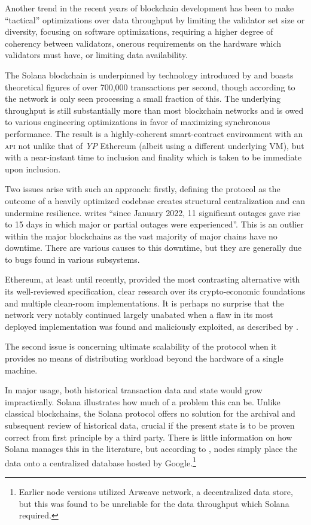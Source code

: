 Another trend in the recent years of blockchain development has been to make ``tactical'' optimizations over data throughput by limiting the validator set size or diversity, focusing on software optimizations, requiring a higher degree of coherency between validators, onerous requirements on the hardware which validators must have, or limiting data availability.

The Solana blockchain is underpinned by technology introduced by \cite{yakovenko2018solana} and boasts theoretical figures of over 700,000 transactions per second, though according to \cite{ng2024is} the network is only seen processing a small fraction of this. The underlying throughput is still substantially more than most blockchain networks and is owed to various engineering optimizations in favor of maximizing synchronous performance. The result is a highly-coherent smart-contract environment with an \textsc{api} not unlike that of \emph{YP} Ethereum (albeit using a different underlying VM), but with a near-instant time to inclusion and finality which is taken to be immediate upon inclusion.

Two issues arise with such an approach: firstly, defining the protocol as the outcome of a heavily optimized codebase creates structural centralization and can undermine resilience. \cite{jha2024solana} writes ``since January 2022, 11 significant outages gave rise to 15 days in which major or partial outages were experienced''. This is an outlier within the major blockchains as the vast majority of major chains have no downtime. There are various causes to this downtime, but they are generally due to bugs found in various subsystems.

Ethereum, at least until recently, provided the most contrasting alternative with its well-reviewed specification, clear research over its crypto-economic foundations and multiple clean-room implementations. It is perhaps no surprise that the network very notably continued largely unabated when a flaw in its most deployed implementation was found and maliciously exploited, as described by \cite{hertig2016so}.

The second issue is concerning ultimate scalability of the protocol when it provides no means of distributing workload beyond the hardware of a single machine.

In major usage, both historical transaction data and state would grow impractically. Solana illustrates how much of a problem this can be. Unlike classical blockchains, the Solana protocol offers no solution for the archival and subsequent review of historical data, crucial if the present state is to be proven correct from first principle by a third party. There is little information on how Solana manages this in the literature, but according to \cite{solana2023solana}, nodes simply place the data onto a centralized database hosted by Google.\footnote{Earlier node versions utilized Arweave network, a decentralized data store, but this was found to be unreliable for the data throughput which Solana required.}


